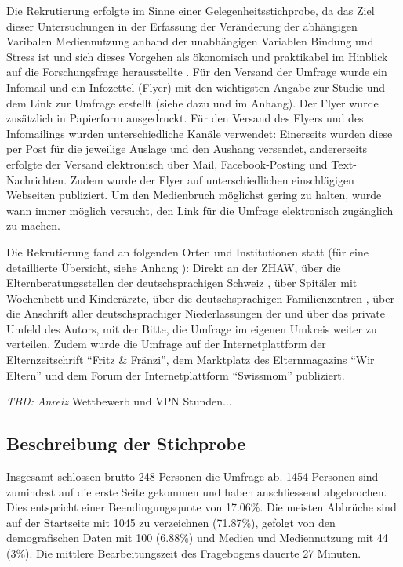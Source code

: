 Die Rekrutierung erfolgte im Sinne einer Gelegenheitsstichprobe, da das Ziel dieser Untersuchungen in der Erfassung der Veränderung der abhängigen Varibalen Mediennutzung anhand der unabhängigen Variablen Bindung und Stress ist und sich dieses Vorgehen als ökonomisch und praktikabel im Hinblick auf die Forschungsfrage herausstellte \cite{TUDresden2015}. Für den Versand der Umfrage wurde ein Infomail und ein Infozettel (Flyer) mit den wichtigsten Angabe zur Studie und dem Link zur Umfrage erstellt (siehe dazu  und  im Anhang). Der Flyer wurde zusätzlich in Papierform ausgedruckt. Für den Versand des Flyers und des Infomailings wurden unterschiedliche Kanäle verwendet: Einerseits wurden diese per Post für die jeweilige Auslage und den Aushang versendet, andererseits erfolgte der Versand elektronisch über Mail, Facebook-Posting und Text-Nachrichten. Zudem wurde der Flyer auf unterschiedlichen einschlägigen Webseiten publiziert. Um den Medienbruch möglichst gering zu halten, wurde wann immer möglich versucht, den Link für die Umfrage elektronisch zugänglich zu machen. 

Die Rekrutierung fand an folgenden Orten und Institutionen statt (für eine detaillierte Übersicht, siehe Anhang ): Direkt an der ZHAW, über die Elternberatungsstellen der deutschsprachigen Schweiz \cite{Sfmvb2018}, über Spitäler mit Wochenbett und Kinderärzte, über die deutschsprachigen Familienzentren \cite{NetzwerkBildung2018}, über die Anschrift aller deutschsprachiger Niederlassungen der  und über das private Umfeld des Autors, mit der Bitte, die Umfrage im eigenen Umkreis weiter zu verteilen. Zudem wurde die Umfrage auf der Internetplattform der Elternzeitschrift \enquote{Fritz \&  Fränzi}, dem Marktplatz des Elternmagazins \enquote{Wir Eltern} und dem Forum der Internetplattform \enquote{Swissmom} publiziert.

\textit{TBD: Anreiz} Wettbewerb und VPN Stunden...

\subsection{Beschreibung der Stichprobe}
Insgesamt schlossen brutto 248 Personen die Umfrage ab. 1454 Personen sind zumindest auf die erste Seite gekommen und haben anschliessend abgebrochen. Dies entspricht einer Beendingungsquote von 17.06\%. Die meisten Abbrüche sind auf der Startseite mit 1045 zu verzeichnen (71.87\%), gefolgt von den demografischen Daten mit 100 (6.88\%) und Medien und Mediennutzung mit 44 (3\%). Die mittlere Bearbeitungszeit des Fragebogens dauerte 27 Minuten. 


